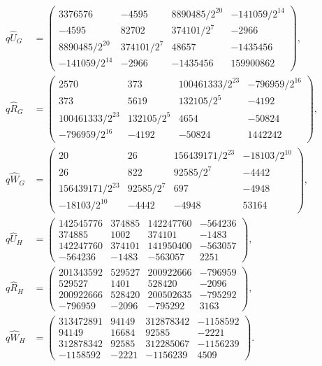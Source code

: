 \begingroup
\small
\allowdisplaybreaks
\setlength{\arraycolsep}{3pt}
\begin{align*}
q\widehat U_G&=\begin{pmatrix}
3376576&-4595&8890485/2^{20}&-141059/2^{14}\\
-4595&82702&374101/2^7&-2966\\
8890485/2^{20}&374101/2^7&48657&-1435456\\
-141059/2^{14}&-2966&-1435456&159900862
\end{pmatrix},\\[3pt]
q\widehat R_G&=\begin{pmatrix}
2570&373&100461333/2^{23}&-796959/2^{16}\\
373&5619&132105/2^5&-4192\\
100461333/2^{23}&132105/2^5&4654&-50824\\
-796959/2^{16}&-4192&-50824&1442242
\end{pmatrix},\\[3pt]
q\widehat W_G&=\begin{pmatrix}
20&26&156439171/2^{23}&-18103/2^{10}\\
26&822&92585/2^7&-4442\\
156439171/2^{23}&92585/2^7&697&-4948\\
-18103/2^{10}&-4442&-4948&53164
\end{pmatrix},\\[3pt]
q\widehat U_H&=\begin{pmatrix}
142545776&374885&142247760&-564236\\
374885&1002&374101&-1483\\
142247760&374101&141950400&-563057\\
-564236&-1483&-563057&2251
\end{pmatrix},\\[3pt]
q\widehat R_H&=\begin{pmatrix}
201343592&529527&200922666&-796959\\
529527&1401&528420&-2096\\
200922666&528420&200502635&-795292\\
-796959&-2096&-795292&3163
\end{pmatrix},\\[3pt]
q\widehat W_H&=\begin{pmatrix}
313472891&94149&312878342&-1158592\\
94149&16684&92585&-2221\\
312878342&92585&312285067&-1156239\\
-1158592&-2221&-1156239&4509
\end{pmatrix}.
\end{align*}
\endgroup

